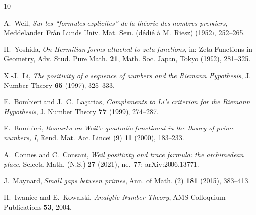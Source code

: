 \documentclass[11pt,reqno]{amsart}
\theoremstyle{plain}
\theoremstyle{definition}
\theoremstyle{remark}
\begin{document}
\begin{thebibliography}{10}

 A.~Weil, \emph{Sur les ``formules explicites'' de la th\'eorie des nombres
premiers}, Meddelanden Fr\aa n Lunds Univ. Mat. Sem. (d\'edi\'e \`a M.~Riesz) (1952), 252--265.

 H.~Yoshida, \emph{On Hermitian forms attached to zeta functions}, in:
Zeta Functions in Geometry, Adv. Stud. Pure Math. \textbf{21}, Math. Soc. Japan, Tokyo (1992),
281--325.

 X.-J.~Li, \emph{The positivity of a sequence of numbers and the Riemann
Hypothesis}, J. Number Theory \textbf{65} (1997), 325--333.

 E.~Bombieri and J.~C.~Lagarias, \emph{Complements to Li's
criterion for the Riemann Hypothesis}, J. Number Theory \textbf{77} (1999), 274--287.

 E.~Bombieri, \emph{Remarks on Weil's quadratic functional in the theory
of prime numbers, I}, Rend. Mat. Acc. Lincei (9) \textbf{11} (2000), 183--233.

 A.~Connes and C.~Consani, \emph{Weil positivity and trace formula: the
archimedean place}, Selecta Math. (N.S.) \textbf{27} (2021), no.~77; arXiv:2006.13771.

 J.~Maynard, \emph{Small gaps between primes}, Ann. of Math. (2)
\textbf{181} (2015), 383--413.

 H.~Iwaniec and E.~Kowalski, \emph{Analytic Number Theory}, AMS Colloquium
Publications \textbf{53}, 2004.

\end{thebibliography}
\end{document}
